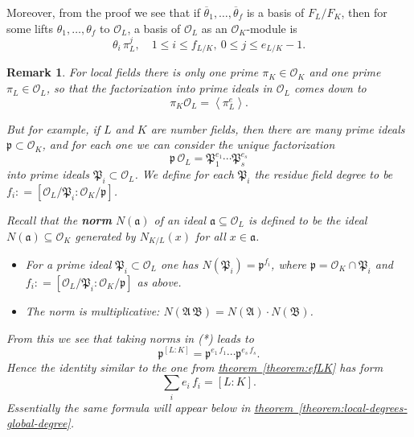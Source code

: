 \documentclass{article}
\newcommand{\term}{\textbf}
\newcommand{\dfn}{\mathrel{\mathop:}=}
\newcommand{\refref}[2]{\hyperref[#2]{#1~\ref*{#2}}}
\theoremstyle{myplain}
\theoremstyle{mydefinition}
\newtheorem{remark}[proposition]{Remark}
\begin{document}
Moreover, from the proof we see that if
$\overline{\theta}_1, \ldots, \overline{\theta}_f$ is a basis of $F_L/F_K$, then
for some lifts $\theta_1, \ldots, \theta_f$ to $\mathcal{O}_L$, a basis of $\mathcal{O}_L$ as an
$\mathcal{O}_K$-module is
\[ \theta_i \, \pi_L^j, \quad 1 \le i \le f_{L/K}, ~ 0 \le j \le e_{L/K}-1. \]

\begin{remark}\label{remark:local-degrees-global-degree-number-fields}
  For local fields there is only one prime $\pi_K \in \mathcal{O}_K$ and one prime
  $\pi_L \in \mathcal{O}_L$, so that the factorization into prime ideals in $\mathcal{O}_L$ comes
  down to
  \[ \pi_K \mathcal{O}_L = \left<\pi_L^e\right>. \]

  But for example, if $L$ and $K$ are number fields, then there are many prime
  ideals $\mathfrak{p} \subset \mathcal{O}_K$, and for each one we can consider the
  unique factorization
  \[ \tag{*} \mathfrak{p}\,\mathcal{O}_L = \mathfrak{P}_1^{e_1} \cdots \mathfrak{P}_s^{e_s} \]
  into prime ideals $\mathfrak{P}_i \subset \mathcal{O}_L$. We define for each
  $\mathfrak{P}_i$ the residue field degree to be
  $f_i \dfn [\mathcal{O}_L / \mathfrak{P}_i : \mathcal{O}_K / \mathfrak{p}]$.

  Recall that the \term{norm} $N (\mathfrak{a})$ of an ideal
  $\mathfrak{a} \subseteq \mathcal{O}_L$ is defined to be the ideal
  $N (\mathfrak{a}) \subseteq \mathcal{O}_K$ generated by $N_{K/L} (x)$ for all
  $x \in \mathfrak{a}$.

  \begin{itemize}
  \item For a prime ideal $\mathfrak{P}_i \subset \mathcal{O}_L$ one has
    $N (\mathfrak{P}_i) = \mathfrak{p}^{f_i}$, where
    $\mathfrak{p} = \mathcal{O}_K\cap\mathfrak{P}_i$ and
    $f_i \dfn [\mathcal{O}_L/\mathfrak{P}_i : \mathcal{O}_K/\mathfrak{p}]$ as above.

  \item The norm is multiplicative:
    $N (\mathfrak{A}\,\mathfrak{B}) = N (\mathfrak{A}) \cdot N (\mathfrak{B})$.
  \end{itemize}

  From this we see that taking norms in (*) leads to
  \[ \mathfrak{p}^{[L:K]} = \mathfrak{p}^{e_1 \, f_1} \cdots \mathfrak{p}^{e_s \, f_s}. \]
  Hence the identity similar to the one from \refref{theorem}{theorem:efLK} has
  form
  \[ \sum_i e_i\,f_i = [L : K]. \]
  Essentially the same formula will appear below in
  \refref{theorem}{theorem:local-degrees-global-degree}.
\end{remark}
\end{document}
